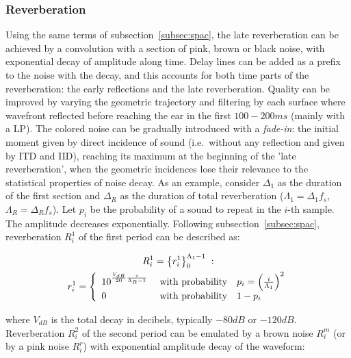 \subsubsection{Reverberation}\label{subsubsec:reverb}
Using the same terms of subsection~\ref{subsec:spac}, the
late reverberation can be achieved by a convolution with a section of pink, brown or black noise, with exponential decay of amplitude along time. Delay lines can be added as a prefix to the noise
with the decay, and this accounts for both time parts of the reverberation: the early reflections and the late reverberation. Quality can be improved by varying the geometric trajectory and filtering by each surface where wavefront reflected before reaching the ear in the first $100-200ms$ (mainly with a LP). The colored noise can be gradually introduced with a \emph{fade-in}: the initial moment given by direct
incidence of sound (i.e.\ without any reflection and given by ITD and IID), reaching its maximum at the beginning of the 'late
reverberation', when the geometric incidences lose their relevance to the statistical properties of noise decay. As an example, consider $\Delta_1$ as the duration of the first section and $\Delta_R$ as the duration of total reverberation ($\Lambda_1=\Delta_1 f_s$, $\Lambda_R=\Delta_R
f_s$). Let $p_i$ be the probability of a sound to repeat in the
$i$-th sample. The amplitude decreases exponentially. Following
subsection~\ref{subsec:spac}, reverberation $R_i^1$ of the first period can be described as:

\begin{equation}\label{eq:p1rev}
\begin{split}
    R_i^1=\left\{r_i^1\right\}_0^{\Lambda_1-1}\;:\quad\quad\quad\quad\quad\quad\quad\quad \\ 
\;r_i^1=\left\{
        \begin{array}{l l}
            10^{\frac{V_{dB}}{20}\frac{i}{\Lambda_R-1}}\;  & \text{with probability}\quad p_i=\left(\frac{i}{\Lambda_1}\right)^2 \\
                                     0 \; & \text{with probability}\quad 1-p_i \\
        \end{array} \right.
\end{split}
\end{equation}

\noindent where $V_{dB}$ is the total decay in decibels, typically $-80dB$ or $-120dB$. Reverberation $R_i^2$ of the second period can be emulated by a brown noise $R_i^m$ (or by a pink noise $R_i^r$) with exponential amplitude decay of the waveform:

